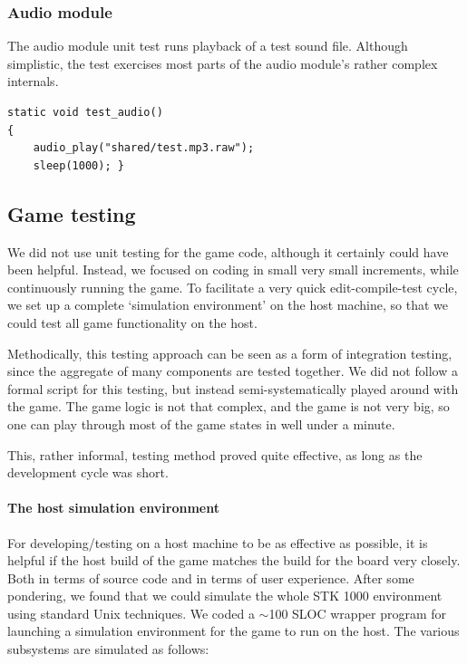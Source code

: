 \documentclass[a4paper,10pt]{article}
\begin{document}
\subsubsection{Audio module}
The audio module unit test runs playback of a test sound file. Although
simplistic, the test exercises most parts of the audio module's rather complex
internals.
\begin{lstlisting}
static void test_audio()
{
    audio_play("shared/test.mp3.raw");
    sleep(1000); }
\end{lstlisting}


\subsection{Game testing}
We did not use unit testing for the game code, although it certainly could
have been helpful. Instead, we focused on coding in small very small
increments, while continuously running the game.  To facilitate a very quick
edit-compile-test cycle, we set up a complete `simulation environment' on the
host machine, so that we could test all game functionality on the host.

Methodically, this testing approach can be seen as a form of integration
testing, since the aggregate of many components are tested together. We did
not follow a formal script for this testing, but instead semi-systematically
played around with the game. The game logic is not that complex, and the game
is not very big, so one can play through most of the game states in well under
a minute. 

This, rather informal, testing method proved quite effective, as long as the
development cycle was short. 

\paragraph{The host simulation environment}
For developing/testing on a host machine to be as effective as possible, it is
helpful if the host build of the game matches the build for the board very
closely.  Both in terms of source code and in terms of user experience.  After
some pondering, we found that we could simulate the whole STK 1000 environment
using standard Unix techniques. We coded a $\sim$100 SLOC wrapper program for
launching a simulation environment for the game to run on the host.  The
various subsystems are simulated as follows:
\end{document}
